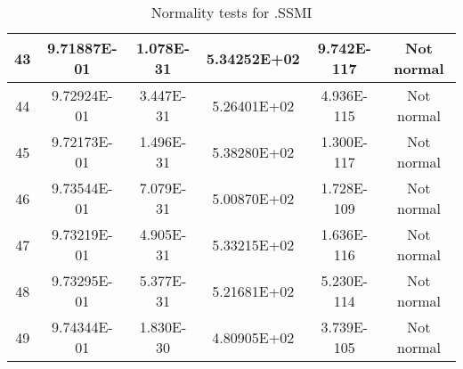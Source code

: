 \begin{table}[h]
\begin{tabular}{|c|c|c|c|c|c|}
		43 & 9.71887E-01 & 1.078E-31 & 5.34252E+02 & 9.742E-117 & Not normal\\\hline
		44 & 9.72924E-01 & 3.447E-31 & 5.26401E+02 & 4.936E-115 & Not normal\\\hline
		45 & 9.72173E-01 & 1.496E-31 & 5.38280E+02 & 1.300E-117 & Not normal\\\hline
		46 & 9.73544E-01 & 7.079E-31 & 5.00870E+02 & 1.728E-109 & Not normal\\\hline
		47 & 9.73219E-01 & 4.905E-31 & 5.33215E+02 & 1.636E-116 & Not normal\\\hline
		48 & 9.73295E-01 & 5.377E-31 & 5.21681E+02 & 5.230E-114 & Not normal\\\hline
		49 & 9.74344E-01 & 1.830E-30 & 4.80905E+02 & 3.739E-105 & Not normal\\\hline
	\end{tabular}
	\caption{Normality tests for .SSMI}
\end{table}
